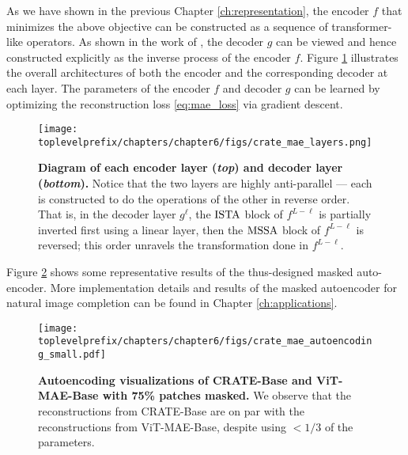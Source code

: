 \documentclass[../../book-main.tex]{subfiles}
\begin{document}
As we have shown in the previous Chapter \ref{ch:representation}, the
encoder $f$ that minimizes the above objective can be constructed as
a sequence of transformer-like operators. As shown in the work of
\cite{Pai2024masked}, the decoder $g$ can be viewed and hence
constructed explicitly as the inverse process of the encoder $f$.
Figure \ref{fig:crate_mae_layers} illustrates the overall
architectures of both the encoder and the corresponding decoder at
each layer. The parameters of the encoder $f$ and decoder $g$ can be
learned by optimizing the reconstruction loss \eqref{eq:mae_loss} via
gradient descent.

\begin{figure}[t!]
\centering
\texttt{[image: \\toplevelprefix/chapters/chapter6/figs/crate\_mae\_layers.png]}
\caption{\small \textbf{Diagram of each encoder layer
  (\textit{top}) and decoder layer (\textit{bottom}).} Notice that
  the two layers are highly anti-parallel --- each is constructed to
  do the operations of the other in reverse order. That is, in the
  decoder layer \(g^{\ell}\), the \(\operatorname{ISTA}\) block of \(f^{L - \ell}\)
  is partially inverted first using a linear layer, then the
  \(\operatorname{MSSA}\) block of \(f^{L - \ell}\) is reversed; this order
unravels the transformation done in \(f^{L - \ell}\).}
\label{fig:crate_mae_layers}
\end{figure}

Figure \ref{fig:mae_autoencoding-small} shows some representative
results of the thus-designed masked auto-encoder. More implementation details and
results of the masked autoencoder for natural image completion can be
found in Chapter \ref{ch:applications}.
\begin{figure}[t]
\centering
\texttt{[image: \\toplevelprefix/chapters/chapter6/figs/crate\_mae\_autoencoding\_small.pdf]}
\caption{\small \textbf{Autoencoding visualizations of CRATE-Base
  and ViT-MAE-Base \cite{he2022masked} with 75\% patches masked.}
  We observe that the reconstructions from CRATE-Base are on par
  with the reconstructions from ViT-MAE-Base, despite using \(<
  1/3\) of the parameters.
}
\label{fig:mae_autoencoding-small}
\end{figure}
\end{document}
